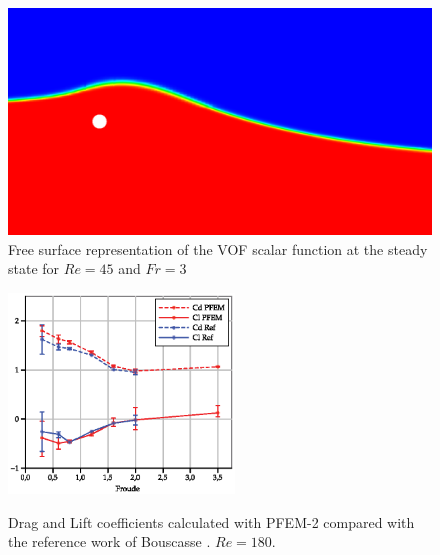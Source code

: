 \documentclass[%
 reprint,
 amsmath,amssymb,
 aps,
prl
]{revtex4-1}
\begin{document}
 \begin{figure}
  \begin{center}
  \includegraphics[width=.9\columnwidth]{vofRe45.png}
  \end{center}
  \caption{Free surface representation of the VOF scalar function at the steady state for $Re=45$ and $Fr=3$}
  \label{f:VOF}
\end{figure}

\begin{figure}
  \begin{center}
  \includegraphics[width=6cm]{CdCl_Re180_hd_0_55.eps}\\
  \end{center}
  \caption{Drag and Lift coefficients calculated with PFEM-2 compared with the reference work of Bouscasse \cite{Bouscasse15}. $Re=180$.} \label{f:CdCl}
\end{figure}
\end{document}
